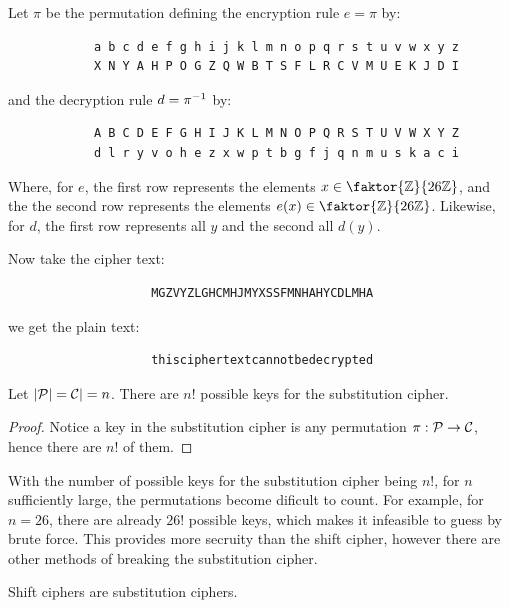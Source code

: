 \begin{example}
    Let $\pi$ be the permutation defining the encryption rule $e=\pi$ by:
        \begin{verbatim}
            a b c d e f g h i j k l m n o p q r s t u v w x y z
            X N Y A H P O G Z Q W B T S F L R C V M U E K J D I
        \end{verbatim}
    and the decryption rule $d=\pi^{-1}$ by:
        \begin{verbatim}
            A B C D E F G H I J K L M N O P Q R S T U V W X Y Z
            d l r y v o h e z x w p t b g f j q n m u s k a c i
        \end{verbatim}
    Where, for $e$, the first row represents the elements $x \in
    \faktor{\Z}{26\Z}$, and the the second row represents the elements $e(x) \in
    \faktor{\Z}{26\Z}$. Likewise, for $d$, the first row represents all  $y$ and
    the second all  $d(y)$.

    Now take the cipher text:
        \begin{verbatim}
                    MGZVYZLGHCMHJMYXSSFMNHAHYCDLMHA
        \end{verbatim}
    we get the plain text:
        \begin{verbatim}
                    thisciphertextcannotbedecrypted
        \end{verbatim}
\end{example}

\begin{lemma}\label{1.1.5}
    Let $|\mathcal{P}|=\mathcal{C}|=n$. There are $n!$ possible keys for the substitution
    cipher.
\end{lemma}
\begin{proof}
    Notice a key in the substitution cipher is any permutation $\pi:\mathcal{P}
    \rightarrow \mathcal{C}$, hence there are $n!$ of them.
\end{proof}
\begin{remark}
    With the number of possible keys for the substitution cipher being $n!$, for
     $n$ sufficiently large, the permutations become dificult to count. For
     example, for $n=26$, there are already  $26!$ possible keys, which makes it
     infeasible to guess by brute force. This provides more secruity than the
     shift cipher, however there are other methods of breaking the substitution
     cipher.
\end{remark}

\begin{example}
    Shift ciphers are substitution ciphers.
\end{example}

